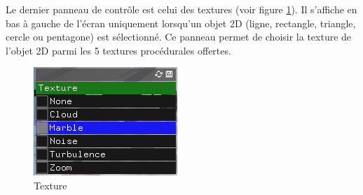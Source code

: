 Le dernier panneau de contrôle est celui des textures (voir figure \ref{fig:texture}).
Il s'affiche en bas à gauche de l'écran uniquement lorsqu'un objet 2D (ligne, rectangle, triangle, cercle ou pentagone) est sélectionné.
Ce panneau permet de choisir la texture de l'objet 2D parmi les 5 textures procédurales offertes.

\begin{figure}
    \centering
	\includegraphics[scale=1]{fig/texture.png}
	\caption{Texture}
	\label{fig:texture}
\end{figure}

